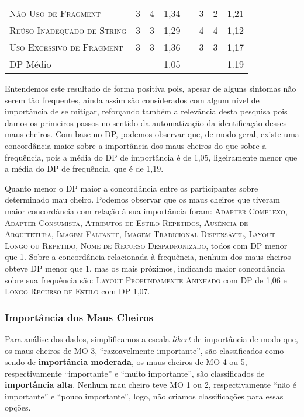 \begin{table}[!htb]
\begin{tabular}{@{}p{9cm}cccp{.5cm}ccc@{}}
\textsc{Não Uso de Fragment} & 3 & 4 & 1,34 & & 3 & 2 & 1,21 \\
\textsc{Reúso Inadequado de String} & 3 & 3 & 1,29 & & 4 & 4 & 1,12 \\
\textsc{Uso Excessivo de Fragment} & 3 & 3 & 1,36 & & 3 & 3 & 1,17 \\
\toprule
DP Médio &  &  & 1.05 &  & &  & 1.19 \\
\bottomrule
\end{tabular}
\label{tab:SmellFrequencyImportance}
\end{table}


Entendemos este resultado de forma positiva pois, apesar de alguns sintomas não serem tão frequentes, ainda assim são considerados com algum nível de importância de se mitigar, reforçando também a relevância desta pesquisa pois damos os primeiros passos no sentido da automatização da identificação desses maus cheiros. Com base no DP, podemos observar que, de modo geral, existe uma concordância maior sobre a importância dos maus cheiros do que sobre a frequência, pois a média do DP de importância é de 1,05, ligeiramente menor que a média do DP de frequência, que é de 1,19.

Quanto menor o DP maior a concordância entre os participantes sobre determinado mau cheiro. Podemos observar que os maus cheiros que tiveram maior concordância com relação à sua importância foram: \textsc{\small Adapter Complexo}, \textsc{\small Adapter Consumista}, \textsc{\small Atributos de Estilo Repetidos}, \textsc{\small Ausência de Arquitetura}, \textsc{\small Imagem Faltante}, \textsc{\small Imagem Tradicional Dispensável}, \textsc{\small Layout Longo ou Repetido}, \textsc{\small Nome de Recurso Despadronizado}, todos com DP menor que 1. Sobre a concordância relacionada à frequência, nenhum dos maus cheiros obteve DP menor que 1, mas os mais próximos, indicando maior concordância sobre sua frequência são: \textsc{\small Layout Profundamente Aninhado} com DP de 1,06 e \textsc{\small Longo Recurso de Estilo} com DP 1,07.


\subsubsection{Importância dos Maus Cheiros}

Para análise dos dados, simplificamos a escala \textit{likert} de importância de modo que, os maus cheiros de MO 3, ``razoavelmente importante'', são classificados como sendo de \textbf{\small importância moderada}, os maus cheiros de MO 4 ou 5, respectivamente ``importante'' e ``muito importante'', são classificados de \textbf{\small importância alta}. Nenhum mau cheiro teve MO 1 ou 2, respectivamente ``não é importante'' e ``pouco importante'', logo, não criamos classificações para essas opções.


